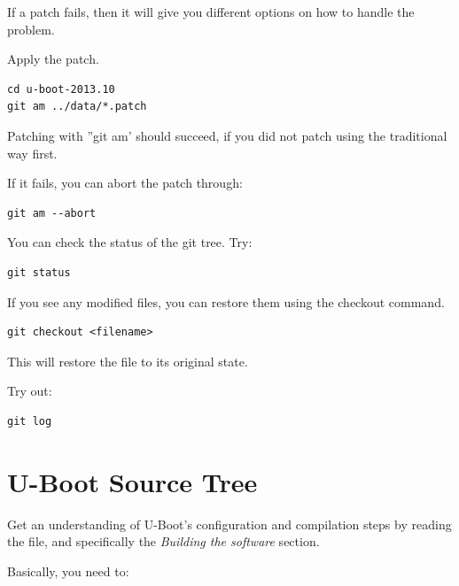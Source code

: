 If a patch fails, then it will give you different options on how to handle the problem.

Apply the patch.

\begin{verbatim}
cd u-boot-2013.10
git am ../data/*.patch
\end{verbatim}

Patching with ''git am' should succeed, if you did not patch using the traditional way first.

If it fails, you can abort the patch through:
{\small
\begin{verbatim}
git am --abort
\end{verbatim}
}

You can check the status of the git tree. Try:
{\small
\begin{verbatim}
git status
\end{verbatim}
}

If you see any modified files, you can restore them using the checkout command.

{\small
\begin{verbatim}
git checkout <filename>
\end{verbatim}
}

This will restore the file to its original state.

Try out:
{\small
\begin{verbatim}
git log
\end{verbatim}
}

\clearpage
\section{U-Boot Source Tree}
Get an understanding of U-Boot's configuration and compilation steps by
reading the  file, and specifically the {\em Building the
  software} section.

Basically, you need to:

